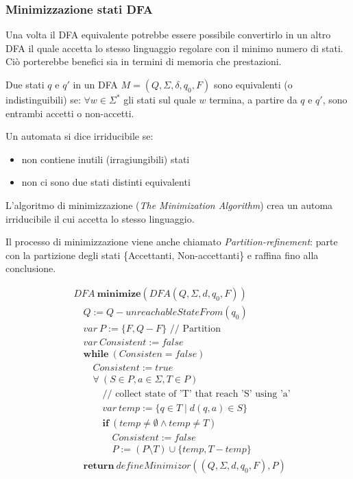 \subsubsection{Minimizzazione stati DFA}
Una volta il DFA equivalente potrebbe essere possibile convertirlo in un altro
DFA il quale accetta lo stesso linguaggio regolare con il minimo numero di
stati. Ciò porterebbe benefici sia in termini di memoria che prestazioni.

\begin{definition}
Due stati $q$ e $q'$ in un DFA $M = (Q,\Sigma,\delta,q_0,F)$ sono equivalenti
(o indistinguibili) se: $\forall w \in \Sigma^*$ gli stati sul quale
$w$ termina, a partire da $q$ e $q'$, sono entrambi accetti o non-accetti.
\end{definition}

\begin{definition}
Un automata si dice irriducibile se:
\begin{itemize}
\item non contiene inutili (irragiungibili) stati
\item non ci sono due stati distinti equivalenti
\end{itemize}
\end{definition}
\bigskip
L'algoritmo di minimizzazione (\textit{The Minimization Algorithm}) crea un
automa irriducibile il cui accetta lo stesso linguaggio.

Il processo di minimizzazione viene anche chiamato
\textit{Partition-refinement}: parte con la partizione degli stati
\{Accettanti, Non-accettanti\} e raffina fino alla conclusione.

\begin{align*}
& DFA \ \mathbf{minimize}(DFA(Q,\Sigma,d,q_0,F))                            \\
& \quad Q := Q - unreachableStateFrom(q_0)                                  \\
& \quad var \ P := \{F,Q-F\} \text{ // Partition }                          \\
& \quad var \ Consistent := false                                           \\
& \quad \mathbf{while} \ (Consisten = false)                                \\
& \qquad Consistent := true                                                 \\
& \qquad \forall \ (S \in P, a \in \Sigma, T \in P)                         \\
& \qquad \quad \text{// collect state of 'T' that reach 'S' using 'a'}      \\
& \qquad \quad var \ temp := \{q \in T \mid d(q,a) \in S\}                  \\
& \qquad \quad \mathbf{if} \ (temp \neq \emptyset \wedge temp \neq T)       \\
& \qquad \qquad Consistent := false                                         \\
& \qquad \qquad P := (P \setminus {T}) \cup \{temp,T-temp\}                 \\
& \quad \mathbf{return} \ defineMinimizor((Q,\Sigma,d,q_0,F),P)
\end{align*}

